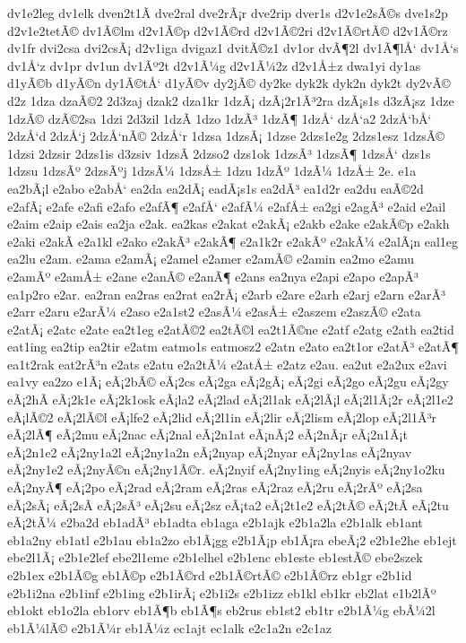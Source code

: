 {dv1e2leg
dv1elk
dven2t1Ã­
dve2ral
dve2rÃ¡r
dve2rip
dver1s
d2v1e2sÃ©s
dve1s2p
d2v1e2tetÃ©
dv1Ã©lm
d2v1Ã©p
d2v1Ã©rd
d2v1Ã©2ri
d2v1Ã©rtÃ©
d2v1Ã©rz
dv1fr
dvi2csa
dvi2csÃ¡
d2v1iga
dvigaz1
dvitÃ©z1
dv1or
dvÃ¶2l
dv1Ã¶lÅ‘
dv1Å‘s
dv1Å‘z
dv1pr
dv1un
dv1Ãº2t
d2v1Ã¼g
d2v1Ã¼2z
d2v1Å±z
dwa1yi
dy1as
d1yÃ©b
d1yÃ©n
dy1Ã©tÅ‘
d1yÃ©v
dy2jÃ©
dy2ke
dyk2k
dyk2n
dyk2t
dy2vÃ©
d2z
1dza
dzaÃ©2
2d3zaj
dzak2
dza1kr
1dzÃ¡
dzÃ¡2r1Ã³2ra
dzÃ¡s1s
d3zÃ¡sz
1dze
1dzÃ©
dzÃ©2sa
1dzi
2d3zil
1dzÃ­
1dzo
1dzÃ³
1dzÃ¶
1dzÅ‘
dzÅ‘a2
2dzÅ‘bÅ‘
2dzÅ‘d
2dzÅ‘j
2dzÅ‘nÃ©
2dzÅ‘r
1dzsa
1dzsÃ¡
1dzse
2dzs1e2g
2dzs1esz
1dzsÃ©
1dzsi
2dzsir
2dzs1is
d3zsiv
1dzsÃ­
2dzso2
dzs1ok
1dzsÃ³
1dzsÃ¶
1dzsÅ‘
dzs1s
1dzsu
1dzsÃº
2dzsÃºj
1dzsÃ¼
1dzsÅ±
1dzu
1dzÃº
1dzÃ¼
1dzÅ±
2e.
e1a
ea2bÃ¡l
e2abo
e2abÅ‘
ea2da
ea2dÃ¡
eadÃ¡s1s
ea2dÃ³
ea1d2r
ea2du
eaÃ©2d
e2afÃ¡
e2afe
e2afi
e2afo
e2afÃ¶
e2afÅ‘
e2afÃ¼
e2afÅ±
ea2gi
e2agÃ³
e2aid
e2ail
e2aim
e2aip
e2ais
ea2ja
e2ak.
ea2kas
e2akat
e2akÃ¡
e2akb
e2ake
e2akÃ©p
e2akh
e2aki
e2akÃ­
e2a1kl
e2ako
e2akÃ³
e2akÃ¶
e2a1k2r
e2akÃº
e2akÃ¼
e2alÃ¡n
eal1eg
ea2lu
e2am.
e2ama
e2amÃ¡
e2amel
e2amer
e2amÃ©
e2amin
ea2mo
e2amu
e2amÃº
e2amÅ±
e2ane
e2anÃ©
e2anÃ¶
e2ans
ea2nya
e2api
e2apo
e2apÃ³
ea1p2ro
e2ar.
ea2ran
ea2ras
ea2rat
ea2rÃ¡
e2arb
e2are
e2arh
e2arj
e2arn
e2arÃ³
e2arr
e2aru
e2arÃ¼
e2aso
e2a1st2
e2asÃ¼
e2asÅ±
e2aszem
e2aszÃ©
e2ata
e2atÃ¡
e2atc
e2ate
ea2t1eg
e2atÃ©2
ea2tÃ©l
ea2t1Ã©ne
e2atf
e2atg
e2ath
ea2tid
eat1ing
ea2tip
ea2tir
e2atm
eatmo1s
eatmosz2
e2atn
e2ato
ea2t1or
e2atÃ³
e2atÃ¶
ea1t2rak
eat2rÃ³n
e2ats
e2atu
e2a2tÃ¼
e2atÅ±
e2atz
e2au.
ea2ut
e2a2ux
e2avi
ea1vy
ea2zo
e1Ã¡
eÃ¡2bÃ©
eÃ¡2cs
eÃ¡2ga
eÃ¡2gÃ¡
eÃ¡2gi
eÃ¡2go
eÃ¡2gu
eÃ¡2gy
eÃ¡2hÃ­
eÃ¡2k1e
eÃ¡2k1osk
eÃ¡la2
eÃ¡2lad
eÃ¡2l1ak
eÃ¡2lÃ¡l
eÃ¡2l1Ã¡2r
eÃ¡2l1e2
eÃ¡lÃ©2
eÃ¡2lÃ©l
eÃ¡lfe2
eÃ¡2lid
eÃ¡2l1in
eÃ¡2lir
eÃ¡2lism
eÃ¡2lop
eÃ¡2l1Ã³r
eÃ¡2lÃ¶
eÃ¡2mu
eÃ¡2nac
eÃ¡2nal
eÃ¡2n1at
eÃ¡nÃ¡2
eÃ¡2nÃ¡r
eÃ¡2n1Ã¡t
eÃ¡2n1e2
eÃ¡2ny1a2l
eÃ¡2ny1a2n
eÃ¡2nyap
eÃ¡2nyar
eÃ¡2ny1as
eÃ¡2nyav
eÃ¡2ny1e2
eÃ¡2nyÃ©n
eÃ¡2ny1Ã©r.
eÃ¡2nyif
eÃ¡2ny1ing
eÃ¡2nyis
eÃ¡2ny1o2ku
eÃ¡2nyÃ¶
eÃ¡2po
eÃ¡2rad
eÃ¡2ram
eÃ¡2ras
eÃ¡2raz
eÃ¡2ru
eÃ¡2rÃº
eÃ¡2sa
eÃ¡2sÃ¡
eÃ¡2sÃ­
eÃ¡2sÃ³
eÃ¡2su
eÃ¡2sz
eÃ¡ta2
eÃ¡2t1e2
eÃ¡2tÃ©
eÃ¡2tÃ­
eÃ¡2tu
eÃ¡2tÃ¼
e2ba2d
eb1adÃ³
eb1adta
eb1aga
e2b1ajk
e2b1a2la
e2b1alk
eb1ant
eb1a2ny
eb1atl
e2b1au
eb1a2zo
eb1Ã¡gg
e2b1Ã¡p
eb1Ã¡ra
ebeÃ¡2
e2b1e2he
eb1ejt
ebe2l1Ã¡
e2b1e2lef
ebe2l1eme
e2b1elhel
e2b1enc
eb1este
eb1estÃ©
ebe2szek
e2b1ex
e2b1Ã©g
eb1Ã©p
e2b1Ã©rd
e2b1Ã©rtÃ©
e2b1Ã©rz
eb1gr
e2b1id
e2b1i2na
e2b1inf
e2b1ing
e2b1irÃ¡
e2b1i2s
e2b1izz
eb1kl
eb1kr
eb2lat
e1b2lÃº
eb1okt
eb1o2la
eb1orv
eb1Ã¶b
eb1Ã¶s
eb2rus
eb1st2
eb1tr
e2b1Ã¼g
ebÃ¼2l
eb1Ã¼lÃ©
e2b1Ã¼r
eb1Ã¼z
ec1ajt
ec1alk
e2c1a2n
e2c1az
}

